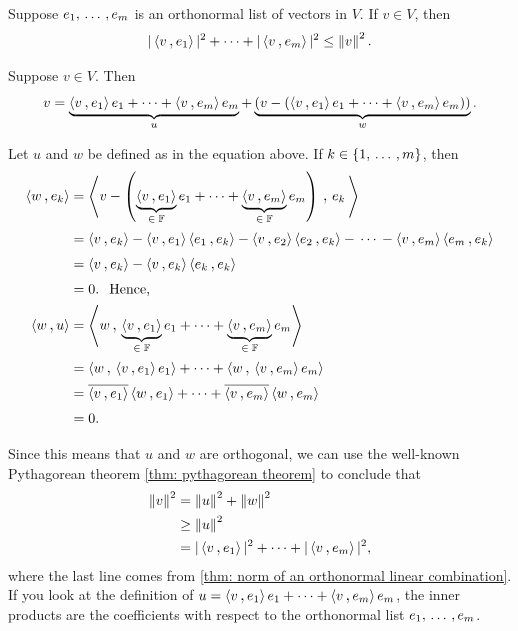 \begin{thm}
  \label{thm: Bessel's inequality}
  Suppose $e_1, {\, \ldots \,\,}, e_m$ is an orthonormal list of vectors in $V$. If $v \in V$, then
  \begin{equation}
    |\ip{v}{e_1}|^2 + \cdots + |\ip{v}{e_m}|^2 \leq \norm{v}^2.
  \end{equation}
\end{thm}
\begin{prf}
  Suppose $v \in V$. Then
  \begin{equation}
    v= \underbrace{\ip{v}{e_1}e_1 + \cdots + \ip{v}{e_m} e_m}_u + \underbrace{\left(v - (\ip{v}{e_1}e_1 + \cdots + \ip{v}{e_m} e_m)\right)}_w.
  \end{equation}

  Let $u$ and $w$ be defined as in the equation above. If $k \in \{1, {\, \ldots \,\,}, m\}$, then
  \begin{equation}
    \begin{aligned}
      \ip{w}{e_k}
      &=\ip{v - \left(\underbrace{\ip{v}{e_1}}_{\in \; \myF}e_1 + \cdots + \underbrace{\ip{v}{e_m}}_{\in \; \myF} e_m\right)}{ \,e_k \,} \\
      &=\ip{v}{e_k} - \ip{v}{e_1}\ip{e_1}{e_k} - \ip{v}{e_2}\ip{e_2}{e_k} - \, \cdots \, - \ip{v}{e_m}\ip{e_m}{e_k} \\
      &=\ip{v}{e_k} - \ip{v}{e_k}\ip{e_k}{e_k} \\
      &=0. \mytext{Hence,} \\
      \ip{w}{u}
      & = \ip{w}{\underbrace{\ip{v}{e_1}}_{\in \; \myF}e_1 + \cdots + \underbrace{\ip{v}{e_m}}_{\in \; \myF} e_m} \\
      & = \ip{w}{\ip{v}{e_1}e_1} + \cdots + \ip{w}{\ip{v}{e_m}e_m} \\
      & = \overline{\ip{v}{e_1}}\ip{w}{e_1} + \cdots + \overline{\ip{v}{e_m}}\ip{w}{e_m} \\
      & = 0.
    \end{aligned}
  \end{equation}

  Since this means that $u$ and $w$ are orthogonal, we can use the well-known Pythagorean theorem \ref{thm: pythagorean theorem} to conclude that
  \begin{equation}
    \begin{aligned}
      \norm{v}^2
      &=    \norm{u}^2 + \norm{w}^2 \\
      &\geq \norm{u}^2 \\
      &= |\ip{v}{e_1}|^2 + \cdots + |\ip{v}{e_m}|^2,
    \end{aligned}
  \end{equation}
  where the last line comes from \ref{thm: norm of an orthonormal linear combination}. If you look at the definition of $u=\ip{v}{e_1}e_1 + \cdots + \ip{v}{e_m} e_m$, the inner products are the coefficients with respect to the orthonormal list $e_1, {\, \ldots \,\,}, e_m$.
\end{prf}

